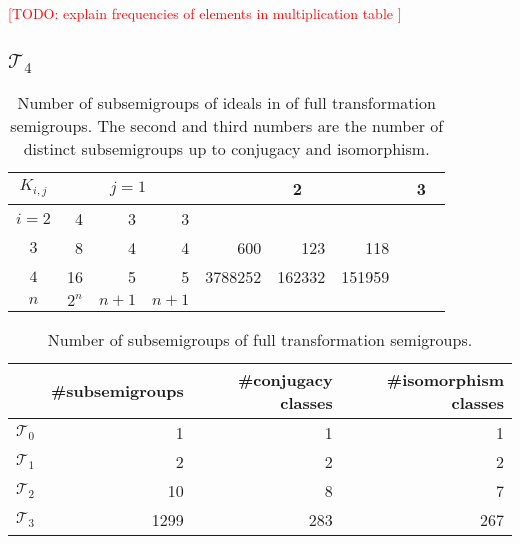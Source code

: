 \documentclass{amsart}
\newcommand{\cT}{{\mathcal T}}
\newcommand{\todo}[1]{\textcolor{red}{ \small \textsf{[TODO:  #1 ]} \normalsize}}
\theoremstyle{plain}
\theoremstyle{definition}
\begin{document}
\todo{explain frequencies of elements in multiplication table}

\subsection{$\cT_4$}


\begin{table}
\renewcommand{\arraystretch}{1}
\begin{tabular}{|c|r|r|r||r|r|r||r|r|r|}
\hline
$K_{i,j}$ & \multicolumn{3}{c||}{$j=1$} & \multicolumn{3}{c||}{2} & \multicolumn{3}{c|}{3} \\
\hline
$i=2$ & 4&3&3   & \cellcolor{gray9}  & \cellcolor{gray9}&  \cellcolor{gray9} & \cellcolor{gray9}  &\cellcolor{gray9} &\cellcolor{gray9}\\
\hline
$3$ &  8&4&4  &  600 & 123 & 118  & \cellcolor{gray9}  & \cellcolor{gray9}&\cellcolor{gray9}\\
\hline
$4$ & 16&5&5  &  3788252 & 162332 & 151959  &   & &\\
\hline
$n$ & $2^n$&$n+1$&$n+1$    &    & &    &    & & \\
\hline

\end{tabular}
\caption{Number of subsemigroups of ideals in of full transformation semigroups. The second and third numbers are the number of distinct subsemigroups up to conjugacy and isomorphism.}
\end{table}


\begin{table}
\renewcommand{\arraystretch}{1}
\begin{tabular}{|c|r|r|r|}
\hline
 & \#subsemigroups & \#conjugacy classes & \#isomorphism classes \\
\hline
$\cT_0$ & 1  & 1 & 1\\
\hline
$\cT_1$ & 2  & 2 & 2\\
\hline
$\cT_2$ & 10  & 8 & 7\\
\hline
$\cT_3$ & 1299 & 283 & 267\\
\hline
\end{tabular}
\caption{Number of subsemigroups of full transformation semigroups.}
\end{table}



\end{document}
